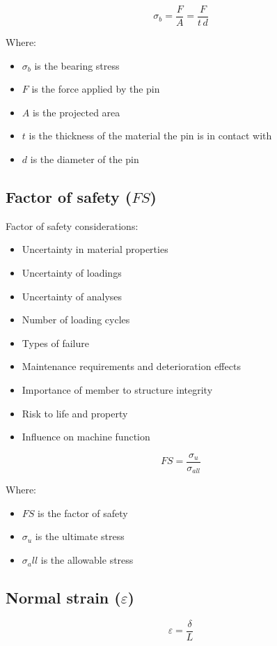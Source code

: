 \documentclass[11pt]{article}
\begin{document}
\[\sigma_b = \frac{F}{A} = \frac{F}{t \, d}\]

Where:
\begin{itemize}
\item \(\sigma_b\) is the bearing stress
\item \(F\) is the force applied by the pin
\item \(A\) is the projected area
\item \(t\) is the thickness of the material the pin is in contact with
\item \(d\) is the diameter of the pin
\end{itemize}

\newpage

\subsection{Factor of safety (\(FS\))}
\label{sec:orgd72a6c8}
Factor of safety considerations:
\begin{itemize}
\item Uncertainty in material properties
\item Uncertainty of loadings
\item Uncertainty of analyses
\item Number of loading cycles
\item Types of failure
\item Maintenance requirements and deterioration effects
\item Importance of member to structure integrity
\item Risk to life and property
\item Influence on machine function
\end{itemize}

\[FS = \frac{\sigma_u}{\sigma_{all}}\]

Where:
\begin{itemize}
\item \(FS\) is the factor of safety
\item \(\sigma_u\) is the ultimate stress
\item \(\sigma_all\) is the allowable stress
\end{itemize}

\subsection{Normal strain (\(\varepsilon\))}
\label{sec:orgba04cbd}
\[\varepsilon = \frac{\delta}{L}\]
\end{document}
